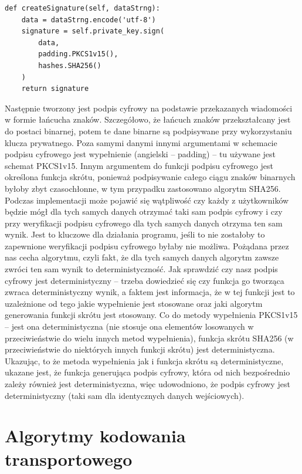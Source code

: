 \begin{lstlisting}[caption={Tworzenie podpisu elektronicznego}]
def createSignature(self, dataStrng):
    data = dataStrng.encode('utf-8')
    signature = self.private_key.sign(
        data,
        padding.PKCS1v15(),
        hashes.SHA256()
    )
    return signature
\end{lstlisting}
Następnie tworzony jest podpis cyfrowy na podstawie przekazanych wiadomości w formie łańcucha znaków. Szczegółowo, że łańcuch znaków przekształcany jest do postaci binarnej, potem te dane binarne są podpisywane przy wykorzystaniu klucza prywatnego. Poza samymi danymi innymi argumentami w schemacie podpisu cyfrowego jest wypełnienie (angielski – padding) – tu używane jest schemat PKCS1v15. Innym argumentem do funkcji podpisu cyfrowego jest określona funkcja skrótu, ponieważ podpisywanie całego ciągu znaków binarnych byłoby zbyt czasochłonne, w tym przypadku zastosowano algorytm SHA256. Podczas implementacji może pojawić się wątpliwość czy każdy z użytkowników będzie mógł dla tych samych danych otrzymać taki sam podpis cyfrowy i czy przy weryfikacji podpisu cyfrowego dla tych samych danych otrzyma ten sam wynik. Jest to kluczowe dla działania programu, jeśli to nie zostałoby to zapewnione weryfikacji podpisu cyfrowego byłaby nie możliwa. Pożądana przez nas cecha algorytmu, czyli fakt, że dla tych samych danych algorytm zawsze zwróci ten sam wynik to deterministyczność. Jak sprawdzić czy nasz podpis cyfrowy jest deterministyczny – trzeba dowiedzieć się czy funkcja go tworząca zwraca deterministyczny wynik, a faktem jest informacja, że w tej funkcji jest to uzależnione od tego jakie wypełnienie jest stosowane oraz jaki algorytm generowania funkcji skrótu jest stosowany. Co do metody wypełnienia PKCS1v15 – jest ona deterministyczna (nie stosuje ona elementów losowanych w przeciwieństwie do wielu innych metod wypełnienia), funkcja skrótu SHA256 (w przeciwieństwie do niektórych innych funkcji skrótu) jest deterministyczna. Ukazując, to że metoda wypełnienia jak i funkcja skrótu są deterministyczne, ukazane jest, że funkcja generująca podpis cyfrowy, która od nich bezpośrednio zależy również jest deterministyczna, więc udowodniono, że podpis cyfrowy jest deterministyczny (taki sam dla identycznych danych wejściowych).

\section{Algorytmy kodowania transportowego}
